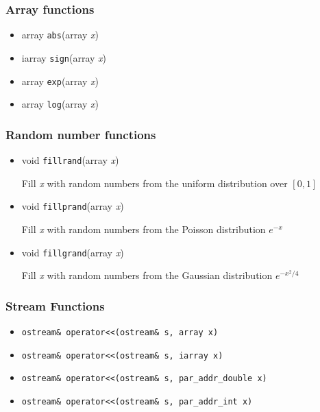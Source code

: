 \subsubsection{Array functions}
\begin{itemize}
\item array {\tt abs}(array {\em x})
\item iarray {\tt sign}(array {\em x})
\item array {\tt exp}(array {\em x})
\item array {\tt log}(array {\em x})
\end{itemize}

\subsubsection{Random number functions}

\begin{itemize}
\item void {\tt fillrand}(array {\em x}) 

Fill {\em x} with random numbers from the uniform distribution over $[0,1]$

\item void {\tt fillprand}(array {\em x})

Fill {\em x} with random numbers from the Poisson distribution $e^{-x}$

\item void {\tt fillgrand}(array {\em x})

Fill {\em x} with random numbers from the Gaussian distribution $e^{-x^2/4}$

\end{itemize}

\subsubsection{Stream Functions}
\begin{itemize}
\item \verb|ostream& operator<<(ostream& s, array x)|
\item \verb|ostream& operator<<(ostream& s, iarray x)|
\item \verb|ostream& operator<<(ostream& s, par_addr_double x)|
\item \verb|ostream& operator<<(ostream& s, par_addr_int x)|
\end{itemize}

